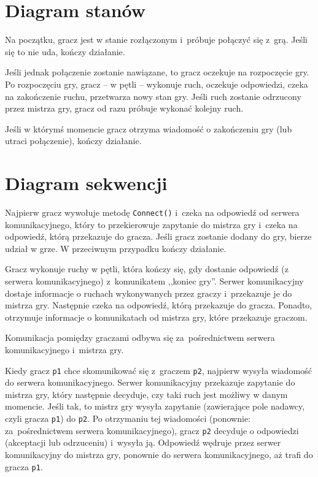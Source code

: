 \documentclass[a4paper]{article}
\newcommand{\code}{\texttt}
\begin{document}
\newpage
\section{Diagram stanów}


Na początku, gracz jest w stanie rozłączonym i~próbuje połączyć się z~grą.
Jeśli się to nie uda, kończy działanie.

Jeśli jednak połączenie zostanie nawiązane, to gracz oczekuje na rozpoczęcie gry.
Po rozpoczęciu gry, gracz -- w pętli -- wykonuje ruch, oczekuje odpowiedzi, czeka na zakończenie ruchu, przetwarza nowy stan gry.
Jeśli ruch zostanie odrzucony przez mistrza gry, gracz od razu próbuje wykonać kolejny ruch.

Jeśli w którymś momencie gracz otrzyma wiadomość o zakończeniu gry (lub utraci połączenie), kończy działanie.

\newpage
\section{Diagram sekwencji}


Najpierw gracz wywołuje metodę \code{Connect()} i~czeka na odpowiedź od serwera komunikacyjnego, który to przekierowuje zapytanie do mistrza gry i~czeka na odpowiedź, którą przekazuje do gracza.
Jeśli gracz zostanie dodany do gry, bierze udział w grze.
W przeciwnym przypadku kończy działanie.



Gracz wykonuje ruchy w pętli, która kończy się, gdy dostanie odpowiedź (z serwera komunikacyjnego) z~komunikatem ,,koniec gry''.
Serwer komunikacyjny dostaje informacje o ruchach wykonywanych przez graczy i~przekazuje je do mistrza gry.
Następnie czeka na odpowiedź, którą przekazuje do gracza.
Ponadto, otrzymuje informacje o komunikatach od mistrza gry, które przekazuje graczom.



Komunikacja pomiędzy graczami odbywa się za~pośrednictwem serwera komunikacyjnego i~mistrza gry.

Kiedy gracz \code{p1} chce skomunikować się z~graczem \code{p2}, najpierw wysyła wiadomość do serwera komunikacyjnego.
Serwer komunikacyjny przekazuje zapytanie do mistrza gry, który następnie decyduje, czy taki ruch jest możliwy w danym momencie.
Jeśli tak, to mistrz gry wysyła zapytanie (zawierające pole nadawcy, czyli gracza \code{p1}) do \code{p2}.
Po otrzymaniu tej wiadomości (ponownie: za~pośrednictwem serwera komunikacyjnego), gracz \code{p2} decyduje o odpowiedzi (akceptacji lub odrzuceniu) i~wysyła ją. Odpowiedź wędruje przez serwer komunikacyjny do mistrza gry, ponownie do serwera komunikacyjnego, aż trafi do gracza \code{p1}.
\end{document}
